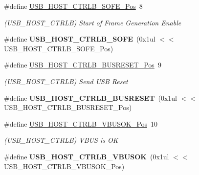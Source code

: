 \begin{DoxyCompactItemize}
\item 
\hypertarget{group___s_a_m_l21___u_s_b_gae4d95883d4ad56f9856b6e00dfb86871}{}\#define \hyperlink{group___s_a_m_l21___u_s_b_gae4d95883d4ad56f9856b6e00dfb86871}{U\+S\+B\+\_\+\+H\+O\+S\+T\+\_\+\+C\+T\+R\+L\+B\+\_\+\+S\+O\+F\+E\+\_\+\+Pos}~8\label{group___s_a_m_l21___u_s_b_gae4d95883d4ad56f9856b6e00dfb86871}

\begin{DoxyCompactList}\small\item\em (U\+S\+B\+\_\+\+H\+O\+S\+T\+\_\+\+C\+T\+R\+L\+B) Start of Frame Generation Enable \end{DoxyCompactList}\item 
\hypertarget{group___s_a_m_l21___u_s_b_ga385275d4296469359bbde42207566864}{}\#define {\bfseries U\+S\+B\+\_\+\+H\+O\+S\+T\+\_\+\+C\+T\+R\+L\+B\+\_\+\+S\+O\+F\+E}~(0x1ul $<$$<$ U\+S\+B\+\_\+\+H\+O\+S\+T\+\_\+\+C\+T\+R\+L\+B\+\_\+\+S\+O\+F\+E\+\_\+\+Pos)\label{group___s_a_m_l21___u_s_b_ga385275d4296469359bbde42207566864}

\item 
\hypertarget{group___s_a_m_l21___u_s_b_ga926f0460d7d0258193ba846808be7267}{}\#define \hyperlink{group___s_a_m_l21___u_s_b_ga926f0460d7d0258193ba846808be7267}{U\+S\+B\+\_\+\+H\+O\+S\+T\+\_\+\+C\+T\+R\+L\+B\+\_\+\+B\+U\+S\+R\+E\+S\+E\+T\+\_\+\+Pos}~9\label{group___s_a_m_l21___u_s_b_ga926f0460d7d0258193ba846808be7267}

\begin{DoxyCompactList}\small\item\em (U\+S\+B\+\_\+\+H\+O\+S\+T\+\_\+\+C\+T\+R\+L\+B) Send U\+S\+B Reset \end{DoxyCompactList}\item 
\hypertarget{group___s_a_m_l21___u_s_b_gaacb998f960d58b73fd84aa4746026de7}{}\#define {\bfseries U\+S\+B\+\_\+\+H\+O\+S\+T\+\_\+\+C\+T\+R\+L\+B\+\_\+\+B\+U\+S\+R\+E\+S\+E\+T}~(0x1ul $<$$<$ U\+S\+B\+\_\+\+H\+O\+S\+T\+\_\+\+C\+T\+R\+L\+B\+\_\+\+B\+U\+S\+R\+E\+S\+E\+T\+\_\+\+Pos)\label{group___s_a_m_l21___u_s_b_gaacb998f960d58b73fd84aa4746026de7}

\item 
\hypertarget{group___s_a_m_l21___u_s_b_ga053fa0f43fd5f012f1a40d99b740f212}{}\#define \hyperlink{group___s_a_m_l21___u_s_b_ga053fa0f43fd5f012f1a40d99b740f212}{U\+S\+B\+\_\+\+H\+O\+S\+T\+\_\+\+C\+T\+R\+L\+B\+\_\+\+V\+B\+U\+S\+O\+K\+\_\+\+Pos}~10\label{group___s_a_m_l21___u_s_b_ga053fa0f43fd5f012f1a40d99b740f212}

\begin{DoxyCompactList}\small\item\em (U\+S\+B\+\_\+\+H\+O\+S\+T\+\_\+\+C\+T\+R\+L\+B) V\+B\+U\+S is O\+K \end{DoxyCompactList}\item 
\hypertarget{group___s_a_m_l21___u_s_b_gaefdde4c742f32db15403c5887913e226}{}\#define {\bfseries U\+S\+B\+\_\+\+H\+O\+S\+T\+\_\+\+C\+T\+R\+L\+B\+\_\+\+V\+B\+U\+S\+O\+K}~(0x1ul $<$$<$ U\+S\+B\+\_\+\+H\+O\+S\+T\+\_\+\+C\+T\+R\+L\+B\+\_\+\+V\+B\+U\+S\+O\+K\+\_\+\+Pos)\label{group___s_a_m_l21___u_s_b_gaefdde4c742f32db15403c5887913e226}


\end{DoxyCompactItemize}

